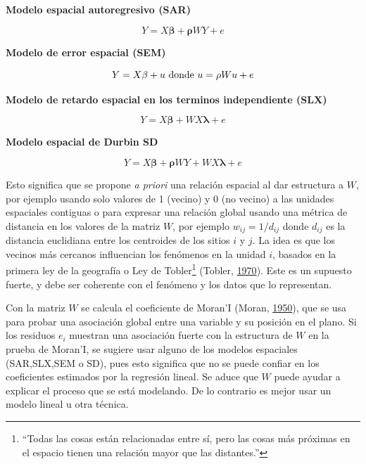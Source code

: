 \documentclass[12pt,a4paper,oneside, openany]{book}
\let\rmarkdownfootnote\footnote%
\def\footnote{\protect\rmarkdownfootnote}
\theoremstyle{definition}
\theoremstyle{definition}
\theoremstyle{definition}
\theoremstyle{remark}
\begin{document}
\textbf{Modelo espacial autoregresivo (SAR)}

\begin{equation}
Y=X\mathbf{\beta}+\mathbf{\rho}WY+e
\label{eq:sar}
\end{equation}

\textbf{Modelo de error espacial (SEM)}

\begin{equation}
Y=X\mathbf{\beta}+u \textrm{ donde } \\
u=\mathbf{\rho}Wu+e
\label{eq:sem}
\end{equation}

\textbf{Modelo de retardo espacial en los terminos independiente (SLX)}

\begin{equation}
Y=X\mathbf{\beta}+WX\mathbf{\lambda}+e
\label{eq:slx}
\end{equation}

\textbf{Modelo espacial de Durbin SD}

\begin{equation}
Y=X\mathbf{\beta}+\mathbf{\rho}WY+WX\mathbf{\lambda}+e
\label{eq:sd}
\end{equation}

Esto significa que se propone \emph{a priori} una relación espacial al
dar estructura a \(W\), por ejemplo usando solo valores de 1 (vecino) y
0 (no vecino) a las unidades espaciales contiguas o para expresar una
relación global usando una métrica de distancia en los valores de la
matriz \(W\), por ejemplo \(w_{ij}= 1/d_{ij}\) donde \(d_{ij}\) es la
distancia euclidiana entre los centroides de los sitios \(i\) y \(j\).
La idea es que los vecinos más cercanos influencian los fenómenos en la
unidad \(i\), basados en la primera ley de la geografía o Ley de
Tobler\footnote{``Todas las cosas están relacionadas entre sí, pero las
  cosas más próximas en el espacio tienen una relación mayor que las
  distantes.''} (Tobler,
\protect\hyperlink{ref-tobler1970computer}{1970}). Este es un supuesto
fuerte, y debe ser coherente con el fenómeno y los datos que lo
representan.

Con la matriz \(W\) se calcula el coeficiente de Moran'I (Moran,
\protect\hyperlink{ref-moran1950notes}{1950}), que se usa para probar
una asociación global entre una variable y su posición en el plano. Si
los residuos \(e_i\) muestran una asociación fuerte con la estructura de
\(W\) en la prueba de Moran'I, se sugiere usar alguno de los modelos
espaciales (SAR,SLX,SEM o SD), pues esto significa que no se puede
confiar en los coeficientes estimados por la regresión lineal. Se aduce
que \(W\) puede ayudar a explicar el proceso que se está modelando. De
lo contrario es mejor usar un modelo lineal u otra técnica.
\end{document}
